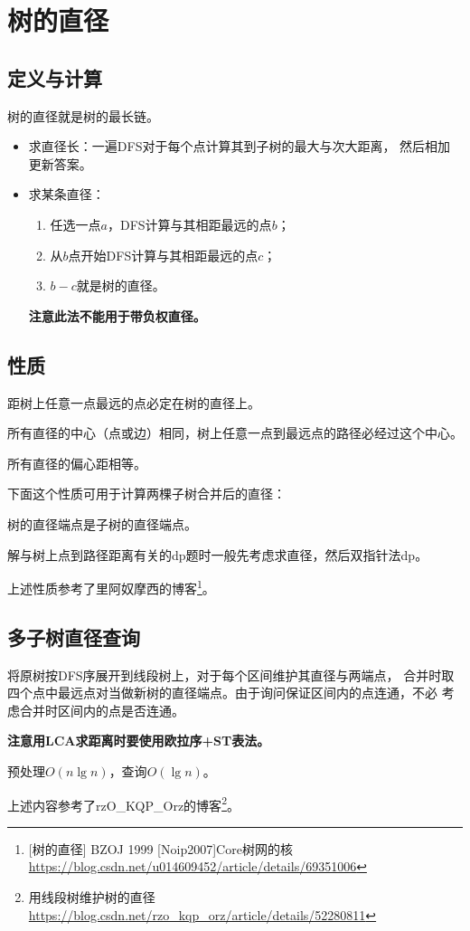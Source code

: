 \section{树的直径}
\subsection{定义与计算}
树的直径就是树的最长链。

\begin{itemize}
    \item 求直径长：一遍DFS对于每个点计算其到子树的最大与次大距离，
    然后相加更新答案。
    \item
    求某条直径：
    \begin{enumerate}
        \item 任选一点$a$，DFS计算与其相距最远的点$b$；
        \item 从$b$点开始DFS计算与其相距最远的点$c$；
        \item $b-c$就是树的直径。
    \end{enumerate}

    {\bfseries 注意此法不能用于带负权直径。}
\end{itemize}

\subsection{性质}

\begin{property}
    距树上任意一点最远的点必定在树的直径上。
\end{property}

\begin{property}
    所有直径的中心（点或边）相同，树上任意一点到最远点的路径必经过这个中心。
\end{property}

\begin{property}
    所有直径的偏心距相等。
\end{property}

下面这个性质可用于计算两棵子树合并后的直径：
\begin{property}
    树的直径端点是子树的直径端点。
\end{property}

解与树上点到路径距离有关的dp题时一般先考虑求直径，然后双指针法dp。

上述性质参考了里阿奴摩西的博客\footnote{[树的直径] BZOJ 1999 [Noip2007]Core树网的核
\url{https://blog.csdn.net/u014609452/article/details/69351006}}。

\subsection{多子树直径查询}
将原树按DFS序展开到线段树上，对于每个区间维护其直径与两端点，
合并时取四个点中最远点对当做新树的直径端点。由于询问保证区间内的点连通，不必
考虑合并时区间内的点是否连通。

{\bfseries 注意用LCA求距离时要使用欧拉序+ST表法。}

预处理$O(n\lg n)$，查询$O(\lg n)$。

上述内容参考了rzO\_KQP\_Orz的博客\footnote{用线段树维护树的直径
\url{https://blog.csdn.net/rzo\_kqp\_orz/article/details/52280811}
}。
